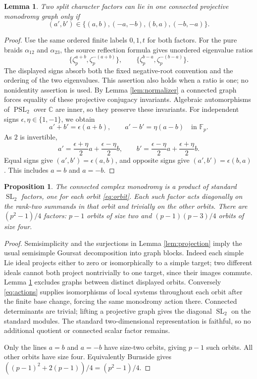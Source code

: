 \documentclass[11pt]{article}
\newtheorem{proposition}[theorem]{Proposition}
\newtheorem{lemma}[theorem]{Lemma}
\theoremstyle{remark}
\newcommand{\F}{\mathbb F}
\newcommand{\C}{\mathbb C}
\newcommand{\SL}{\operatorname{SL}}
\newcommand{\PSL}{\operatorname{PSL}}
\begin{document}
\begin{lemma}\label{lem:two-ratios}
Two split character factors can lie in one connected projective
monodromy graph only if
\begin{equation}\label{eq:orbit}
 (a',b')\in\{(a,b),(-a,-b),(b,a),(-b,-a)\}.
\end{equation}
\end{lemma}
\begin{proof}
Use the same ordered finite labels \(0,1,t\) for both factors.
For the pure braids \(\alpha_{12}\) and \(\alpha_{23}\), the source
reflection formula gives unordered eigenvalue ratios
\[
 \{\zeta_p^{a+b},\zeta_p^{-(a+b)}\},\qquad
 \{\zeta_p^{b-a},\zeta_p^{-(b-a)}\}.
\]
The displayed signs absorb both the fixed negative-root convention
and the ordering of the two eigenvalues.  This assertion also holds
when a ratio is one; no nonidentity assertion is used.
By Lemma \ref{lem:normalizer} a connected graph forces equality of
these projective conjugacy invariants.  Algebraic automorphisms of
\(\PSL_2\) over \(\C\) are inner, so they preserve these invariants.
For independent signs \(\epsilon,\eta\in\{1,-1\}\), we obtain
\[
 a'+b'=\epsilon(a+b),\qquad a'-b'=\eta(a-b)\quad\text{in }\F_p.
\]
As \(2\) is invertible,
\[
 a'=\frac{\epsilon+\eta}{2}a+\frac{\epsilon-\eta}{2}b,\qquad
 b'=\frac{\epsilon-\eta}{2}a+\frac{\epsilon+\eta}{2}b.
\]
Equal signs give \((a',b')=\epsilon(a,b)\), and opposite signs give
\((a',b')=\epsilon(b,a)\).  This includes \(a=b\) and \(a=-b\).
\end{proof}

\begin{proposition}\label{prop:blocks}
The connected complex monodromy is a product of standard \(\SL_2\)
factors, one for each orbit \eqref{eq:orbit}.  Each such factor acts
diagonally on the rank-two summands in that orbit and trivially on the
other orbits.  There are \((p^2-1)/4\) factors: \(p-1\) orbits of size
two and \((p-1)(p-3)/4\) orbits of size four.
\end{proposition}
\begin{proof}
Semisimplicity and the surjections in Lemma \ref{lem:projection} imply
the usual semisimple Goursat decomposition into graph blocks.
Indeed each simple Lie ideal projects either to zero or isomorphically
to a simple target; two different ideals cannot both project
nontrivially to one target, since their images commute.
Lemma \ref{lem:two-ratios} excludes graphs between distinct displayed
orbits.  Conversely \eqref{eq:actions} supplies isomorphisms of local
systems throughout each orbit after the finite base change, forcing
the same monodromy action there.  Connected determinants are trivial;
lifting a projective graph gives the diagonal \(\SL_2\) on the
standard modules.  The standard two-dimensional representation is
faithful, so no additional quotient or connected scalar factor remains.

Only the lines \(a=b\) and \(a=-b\) have size-two orbits, giving \(p-1\)
such orbits.  All other orbits have size four.  Equivalently Burnside
gives \(((p-1)^2+2(p-1))/4=(p^2-1)/4\).
\end{proof}
\end{document}
